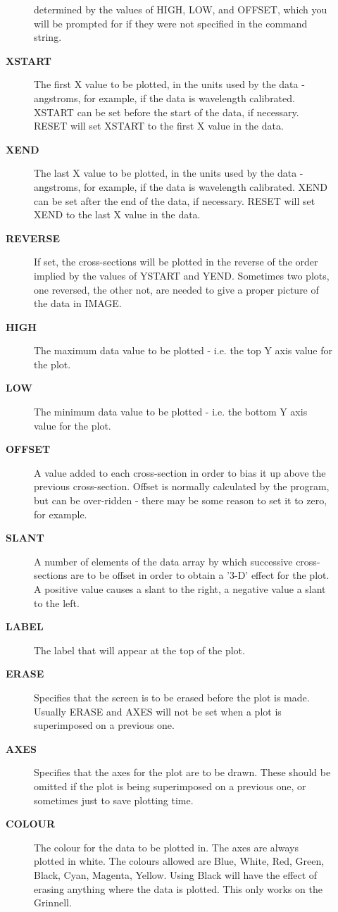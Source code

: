 \begin{description}
\begin{description}
 determined by the values of HIGH, LOW, and OFFSET, which you
 will be prompted for if they were not specified in the command
 string.
\item [{\bf XSTART}]
 The first X value to be plotted, in the units used
 by the data - angstroms, for example, if the data is wavelength
 calibrated.  XSTART can be set before the start of the data, if
 necessary.  RESET will set XSTART to the first X value in the data.
\item [{\bf XEND}]
 The last X value to be plotted, in the units used by
 the data - angstroms, for example, if the data is wavelength
 calibrated.  XEND can be set after the end of the data, if necessary.
 RESET will set XEND to the last X value in the data.
\item [{\bf REVERSE}]
 If set, the cross-sections will be plotted in the reverse of
 the order implied by the values of YSTART and YEND. Sometimes
 two plots, one reversed, the other not, are needed to give a
 proper picture of the data in IMAGE.
\item [{\bf HIGH}]
 The maximum data value to be plotted - i.e. the top Y axis
 value for the plot.
\item [{\bf LOW}]
 The minimum data value to be plotted - i.e. the bottom Y axis
 value for the plot.
\item [{\bf OFFSET}]
 A value added to each cross-section in order to bias it up
 above the previous cross-section.  Offset is normally calculated by
 the program, but can be over-ridden - there may be some reason to set
 it to zero, for example.
\item [{\bf SLANT}]
 A number of elements of the data array by which successive
 cross-sections are to be offset in order to obtain a '3-D' effect for
 the plot.  A positive value causes a slant to the right, a negative
 value a slant to the left.
\item [{\bf LABEL}]
 The label that will appear at the top of the plot.
\item [{\bf ERASE}]
 Specifies that the screen is to be erased before the plot is
 made.  Usually ERASE and AXES will not be set when a plot is
 superimposed on a previous one.
\item [{\bf AXES}]
 Specifies that the axes for the plot are to be drawn.  These
 should be omitted if the plot is being superimposed on a previous
 one, or sometimes just to save plotting time.
\item [{\bf COLOUR}]
 The colour for the data to be plotted in.
 The axes are always plotted in white.  The colours allowed are Blue,
 White, Red, Green, Black, Cyan, Magenta, Yellow.  Using Black will
 have the effect of erasing anything where the data is plotted.  This
 only works on the Grinnell.
\end{description}


\end{description}
